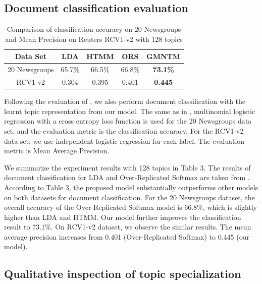 \documentclass[english,letter]{article}
\providecommand{\tabularnewline}{\\}
\renewcommand\[{\begin{equation}}
\renewcommand\]{\end{equation}}
\begin{document}
\subsection{Document classification evaluation}

\begin{table}
\renewcommand{\arraystretch}{1.5}

\begin{centering}
\begin{tabular}{|c|c|c|c|c|}
\hline
Data Set & LDA & HTMM & ORS & GMNTM\tabularnewline
\hline
20 Newsgroups & 65.7\% & 66.5\% & 66.8\% & \textbf{73.1\%}\tabularnewline
\hline
RCV1-v2 & 0.304 & 0.395 & 0.401 & \textbf{0.445}\tabularnewline
\hline
\end{tabular}
\par\end{centering}

\protect\caption{Comparison of classification accuracy on 20 Newsgroups and Mean Precision
on Reuters RCV1-v2 with 128 topics}
\end{table}


Following the evaluation of \cite{srivastava2013modeling}, we also
perform document classification with the learnt topic representation
from our model. The same as in \cite{srivastava2013modeling}, multinomial
logistic regression with a cross entropy loss function is used for
the 20 Newsgroups data set, and the evaluation metric is the classification
accuracy. For the RCV1-v2 data set, we use independent logistic regression
for each label. The evaluation metric is Mean Average Precision.

We summarize the experiment results with 128 topics in Table 3. The
results of document classification for LDA and Over-Replicated Softmax
are taken from \cite{srivastava2013modeling}. According to Table
3, the proposed model substantially outperforms other models on both
datasets for document classification. For the 20 Newsgroups dataset,
the overall accuracy of the Over-Replicated Softmax model is 66.8\%,
which is slightly higher than LDA and HTMM. Our model further improves
the classification result to 73.1\%. On RCV1-v2 dataset, we observe
the similar results. The mean average precision increases from 0.401
(Over-Replicated Softmax) to 0.445 (our model).


\subsection{Qualitative inspection of topic specialization}
\end{document}
